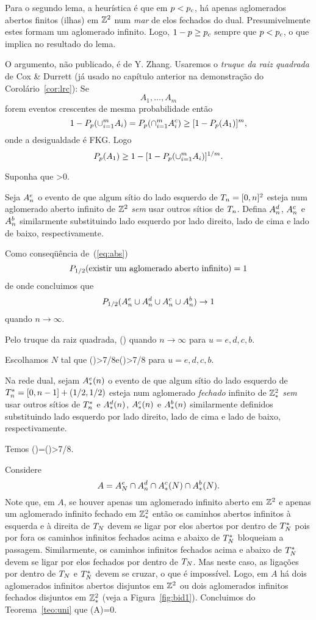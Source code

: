 Para o segundo lema, a heurística é que em $p<p_c$, há apenas aglomerados
abertos finitos (ilhas) em $\mathbb{Z}^2$ num {\em mar} de elos fechados do dual.
Presumivelmente estes formam um aglomerado infinito. Logo, $1-p\geq p_c$
sempre que $p<p_c$, o que implica no resultado do lema.


\vs


O argumento, não publicado, é de Y. Zhang.
Usaremos o {\em truque da raiz quadrada} de Cox \& Durrett (já usado no
capítulo anterior na demonstração do Corolário~\ref{cor:lrc}): Se 
$$A_1,\ldots,A_m$$ forem eventos crescentes de mesma probabilidade então
$$1-P_p(\cup_{i=1}^mA_i)=P_p(\cap_{i=1}^mA_i^c)\geq[1-P_p(A_1)]^m,$$
onde a desigualdade é FKG.
Logo
$$P_p(A_1)\geq1-[1-P_p(\cup_{i=1}^mA_i)]^{1/m}.$$

Suponha que 
\beq
\label{eq:abs}
\th>0.
\eeq

Seja $A_n^e$ o evento de que algum sítio do lado esquerdo de $T_n=[0,n]^2$
esteja num aglomerado aberto infinito de $\mathbb{Z}^2$ {\em sem} usar outros sítios de
$T_n$. Defina $A_n^d$, $A_n^c$ e $A_n^b$ similarmente substituindo lado esquerdo
por lado direito, lado de cima e lado de baixo, respectivamente.

Como conseqüência de~(\ref{eq:abs})
$$P_{1/2}(\mbox{existir um aglomerado aberto infinito})=1$$
de onde concluimos que
$$P_{1/2}(A_n^e\cup A_n^d\cup A_n^c\cup A_n^b)\to1$$quando $n\to\infty.$

Pelo truque da raiz quadrada,
\beq
\ph(\aun)
\eeq
quando $n\to\infty$ para $u=e,d,c,b$.

Escolhamos $N$ tal que 
\beq
\label{eq:abs1}
\ph(\Anu)>7/8\quad\mbox{e}\quad\ph(\Anou)>7/8
\eeq
para $u=e,d,c,b$.

Na rede dual, sejam
$A_\ast^e(n)$ o evento de que algum sítio do lado esquerdo de $T_n^\ast=[0,n-1]+(1/2,1/2)$
esteja num aglomerado {\em fechado} infinito de $\mathbb{Z}^2_\ast$ {\em sem} usar outros sítios de
$T_n^\ast$ e $A_\ast^d(n)$, $A_\ast^c(n)$ e $A_\ast^b(n)$ similarmente definidos substituindo lado esquerdo
por lado direito, lado de cima e lado de baixo, respectivamente.

Temos 
\beq
\label{eq:abs2}
\ph(\asnu)=\ph(\Anou)>7/8.
\eeq

Considere $$A=A_N^e\cap A_n^d\cap A_\ast^c(N)\cap A_\ast^b(N).$$ 
Note que, em $A$, se houver apenas um
aglomerado infinito aberto em $\mathbb{Z}^2$ e apenas um aglomerado infinito fechado em $\mathbb{Z}^2_\ast$
então os caminhos abertos infinitos à esquerda e à direita de $T_N$ devem se ligar por elos
abertos por dentro
de $T_N^\ast$ pois por fora os caminhos infinitos fechados acima e abaixo de $T_N^\ast$ bloqueiam
a passagem. Similarmente, os caminhos infinitos fechados acima e abaixo de $T_N^\ast$ devem se ligar
por elos fechados por dentro de $T_N$. Mas neste caso, as ligações por dentro de $T_N$ e 
$T_N^\ast$
devem se cruzar, o que é impossível. Logo, em $A$ há dois aglomerados infinitos abertos 
disjuntos em $\mathbb{Z}^2$ ou dois aglomerados infinitos fechados disjuntos em $\mathbb{Z}^2_\ast$
(veja a Figura~\ref{fig:bid1}). Concluimos do Teorema~\ref{teo:uni} que 
\beq
\label{eq:zh}
\p(A)=0.
\eeq

